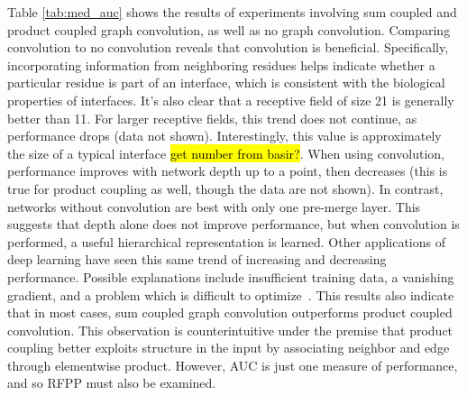 Table \ref{tab:med_auc} shows the results of experiments involving sum coupled and product coupled graph convolution, as well as no graph convolution.
Comparing convolution to no convolution reveals that convolution is beneficial.
Specifically, incorporating information from neighboring residues helps indicate whether a particular residue is part of an interface, which is consistent with the biological properties of interfaces.
It's also clear that a receptive field of size 21 is generally better than 11.
For larger receptive fields, this trend does not continue, as performance drops (data not shown).
Interestingly, this value is approximately the size of a typical interface \hl{get number from basir?}.
When using convolution, performance improves with network depth up to a point, then decreases (this is true for product coupling as well, though the data are not shown).
In contrast, networks without convolution are best with only one pre-merge layer.
This suggests that depth alone does not improve performance, but when convolution is performed, a useful hierarchical representation is learned.
Other applications of deep learning have seen this same trend of increasing and decreasing performance.
Possible explanations include insufficient training data, a vanishing gradient, and a problem which is difficult to optimize~\cite{he2015}.
This results also indicate that in most cases, sum coupled graph convolution outperforms product coupled convolution.
This observation is counterintuitive under the premise that product coupling better exploits structure in the input by associating neighbor and edge through elementwise product.
However, AUC is just one measure of performance, and so RFPP must also be examined.

